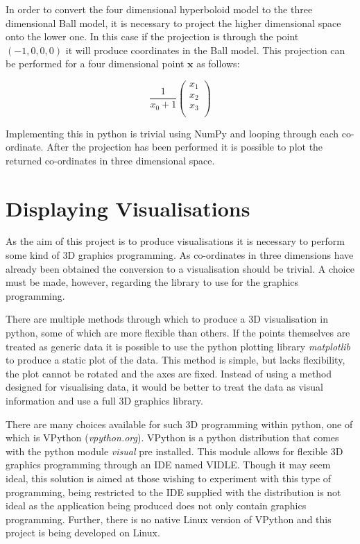 In order to convert the four dimensional hyperboloid model to the three dimensional Ball model, it is necessary to project the higher dimensional space onto the lower one. In this case if the projection is through the point $(-1, 0, 0, 0)$ it will produce coordinates in the Ball model. This projection can be performed for a four dimensional point $\boldsymbol{x}$ as follows:

\begin{equation}
\frac{1}{x_0 + 1}
\begin{pmatrix}
x_1 \\
x_2 \\
x_3 \\
\end{pmatrix}
\end{equation}

Implementing this in python is trivial using NumPy and looping through each co-ordinate. After the projection has been performed it is possible to plot the returned co-ordinates in three dimensional space. 

\section{Displaying Visualisations}
As the aim of this project is to produce visualisations it is necessary to perform some kind of 3D graphics programming. As co-ordinates in three dimensions have already been obtained the conversion to a visualisation should be trivial. A choice must be made, however, regarding the library to use for the graphics programming. 

There are multiple methods through which to produce a 3D visualisation in python, some of which are more flexible than others. If the points themselves are treated as generic data it is possible to use the python plotting library \textit{matplotlib} to produce a static plot of the data. This method is simple, but lacks flexibility, the plot cannot be rotated and the axes are fixed. Instead of using a method designed for visualising data, it would be better to treat the data as visual information and use a full 3D graphics library. 

There are many choices available for such 3D programming within python, one of which is VPython (\textit{vpython.org}). VPython is a python distribution that comes with the python module \textit{visual} pre installed. This module allows for flexible 3D graphics programming through an IDE named VIDLE. Though it may seem ideal, this solution is aimed at those wishing to experiment with this type of programming, being restricted to the IDE supplied with the distribution is not ideal as the application being produced does not only contain graphics programming. Further, there is no native Linux version of VPython and this project is being developed on Linux. 


